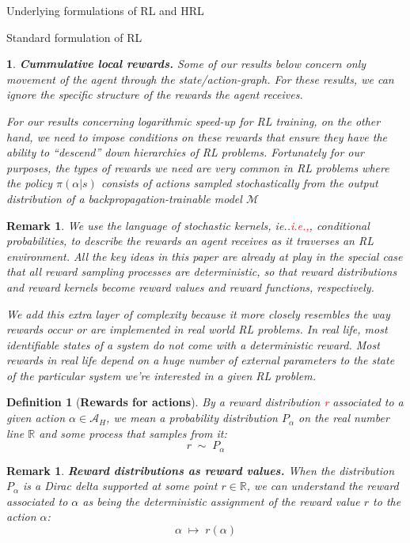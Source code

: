 \documentclass[11pt]{article}
\newtheorem{definition}[subsubsection]{Definition}
\newtheorem{remark}[subsubsection]{Remark}
\newtheorem{ermark}[subsubsection]{}
\begin{document}
\begin{section}{Underlying formulations of RL and HRL}
\begin{subsection}{Standard formulation of RL}
 \begin{ermark}
{\bf Cummulative local rewards.}
\normalfont
Some of our results below concern only movement of the agent through the state/action-graph. For these results, we can ignore the specific structure of the rewards the agent receives. 

For our results concerning logarithmic speed-up for RL training, on the other hand, we need to impose conditions on these rewards that ensure they have the ability to ``descend'' down hierarchies of RL problems. Fortunately for our purposes, the types of rewards we need are very common in RL problems where the policy $\pi(\alpha|s)$ consists of actions sampled stochastically from the output distribution of a backpropagation-trainable model $\mathcal{M}$
 \end{ermark}

\begin{remark}
{\bf }
\normalfont
We use the language of stochastic kernels, ie..\textcolor{red}{i.e.,}, conditional probabilities, to describe the rewards an agent receives as it traverses an RL environment. All the key ideas in this paper are already at play in the special case that all reward sampling processes are deterministic, so that reward distributions and reward kernels become reward values and reward functions, respectively.

We add this extra layer of complexity because {\em it more closely resembles the way rewards occur or are implemented in real world RL problems}. In real life, most identifiable states of a system do not come with a deterministic reward. Most rewards in real life depend on a huge number of external parameters to the state of the particular system we're interested in a given RL problem.
\end{remark}
 
 \begin{definition}[{\bf Rewards for actions}]
 \normalfont
By a {\em reward distribution} \textcolor{red}{r} associated to a given action $\alpha\in\mathcal{A}_{H}$, we mean a probability distribution $P_{\!\alpha}$ on the real number line $\mathbb{R}$ and some process that samples from it:
$$
r\;\sim\;P_{\!\alpha}
$$
\end{definition}

\begin{remark}
{\bf Reward distributions as reward values.}
\normalfont
When the distribution $P_{\!\alpha}$ is a Dirac delta supported at some point $r\in\mathbb{R}$, we can understand the {\em reward associated to} $\alpha$ as being the deterministic assignment of the reward value $r$ to the action $\alpha$:
$$
\alpha\;\mapsto\;r(\alpha)
$$
\end{remark}


\end{subsection}
\end{section}
\end{document}
